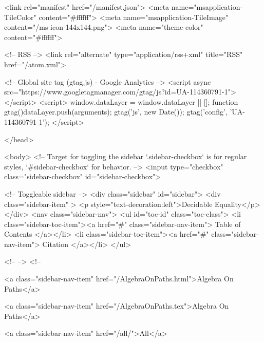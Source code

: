   <link rel="manifest" href="/manifest.json">
  <meta name="msapplication-TileColor" content="#ffffff">
  <meta name="msapplication-TileImage" content="/ms-icon-144x144.png">
  <meta name="theme-color" content="#ffffff">
  
  <!-- RSS -->
  <link rel="alternate" type="application/rss+xml" title="RSS" href="/atom.xml">

  <!-- Global site tag (gtag.js) - Google Analytics -->
  <script async src="https://www.googletagmanager.com/gtag/js?id=UA-114360791-1"></script>
  <script>
    window.dataLayer = window.dataLayer || [];
    function gtag(){dataLayer.push(arguments);}
    gtag('js', new Date());
    gtag('config', 'UA-114360791-1');
  </script>

  
</head>




  <body>
    <!-- Target for toggling the sidebar `.sidebar-checkbox` is for regular
     styles, `#sidebar-checkbox` for behavior. -->
<input type="checkbox" class="sidebar-checkbox" id="sidebar-checkbox">

<!-- Toggleable sidebar -->
<div class="sidebar" id="sidebar">
  <div class="sidebar-item" >
    <p style="text-decoration:left">Decidable Equality</p>
  </div>
  <nav class="sidebar-nav">
    <ul id="toc-id" class="toc-class">
  <li class="sidebar-toc-item"><a href="#" class="sidebar-nav-item"> Table of Contents </a></li>
  <li class="sidebar-toc-item"><a href="#" class="sidebar-nav-item"> Citation </a></li>
</ul>


    <!--  -->
    <!-- 
      
    
      
    
      
    
      
        
      
    
      
        
          <a class="sidebar-nav-item" href="/AlgebraOnPaths.html">Algebra On Paths</a>
        
      
    
      
        
          <a class="sidebar-nav-item" href="/AlgebraOnPaths.tex">Algebra On Paths</a>
        
      
    
      
        
          <a class="sidebar-nav-item" href="/all/">All</a>
        
      
    
      
        
